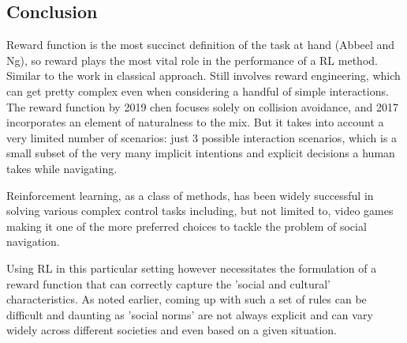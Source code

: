 \subsection*{Conclusion}
Reward function is the most succinct definition of the task at hand (Abbeel and Ng), so reward plays the most vital role in the performance of a RL method. Similar to the work in classical approach. Still involves reward engineering, which can get pretty complex even when considering a handful of simple interactions. The reward function by 2019 chen focuses solely on collision avoidance, and 2017 incorporates an element of naturalness to the mix. But it takes into account a very limited number of scenarios: just 3 possible interaction scenarios, which is a small subset of the very many implicit intentions and explicit decisions a human takes while navigating.  
 
Reinforcement learning, as a class of methods, has been widely successful in solving various complex control tasks including, but not limited to, video games making it one of the more preferred choices to tackle the problem of social navigation. \par
Using RL in this particular setting however necessitates the formulation of a reward function that can correctly capture the 'social and cultural' characteristics. As noted earlier, coming up with such a set of rules can be difficult and daunting as 'social norms' are not always explicit and can vary widely across different societies and even based on a given situation.\\

